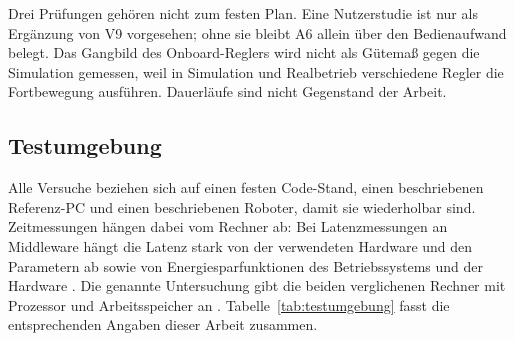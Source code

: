 Drei Prüfungen gehören nicht zum festen Plan.
Eine Nutzerstudie ist nur als Ergänzung von V9 vorgesehen; ohne sie bleibt A6 allein über den Bedienaufwand belegt.
Das Gangbild des Onboard-Reglers wird nicht als Gütemaß gegen die Simulation gemessen, weil in Simulation und Realbetrieb verschiedene Regler die Fortbewegung ausführen.
Dauerläufe sind nicht Gegenstand der Arbeit.

\subsection{Testumgebung}
\label{sec:testumgebung}
Alle Versuche beziehen sich auf einen festen Code-Stand, einen beschriebenen Referenz-PC und einen beschriebenen Roboter, damit sie wiederholbar sind.
Zeitmessungen hängen dabei vom Rechner ab: Bei Latenzmessungen an Middleware hängt die Latenz stark von der verwendeten Hardware und den Parametern ab \cite{Kronauer2021} sowie von Energiesparfunktionen des Betriebssystems und der Hardware \cite{Kronauer2021}.
Die genannte Untersuchung gibt die beiden verglichenen Rechner mit Prozessor und Arbeitsspeicher an \cite{Kronauer2021}.
Tabelle~\ref{tab:testumgebung} fasst die entsprechenden Angaben dieser Arbeit zusammen.

